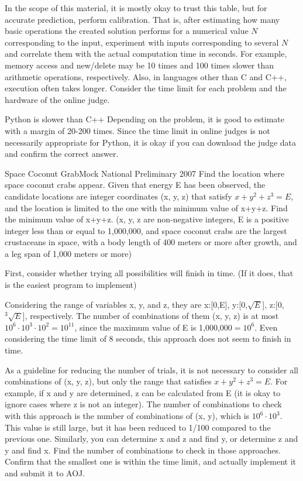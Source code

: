 In the scope of this material, it is mostly okay to trust this table, but for accurate prediction, perform calibration. That is, after estimating how many basic operations the created solution performs for a numerical value $N$ corresponding to the input, experiment with inputs corresponding to several $N$ and correlate them with the actual computation time in seconds. For example, memory access and new/delete may be 10 times and 100 times slower than arithmetic operations, respectively. Also, in languages other than C and C++, execution often takes longer. Consider the time limit for each problem and the hardware of the online judge.

\begin{tipsbox}{Python is slower than C++}
  Depending on the problem, it is good to estimate with a margin of 20-200 times. Since the time limit in online judges is not necessarily appropriate for Python, it is okay if you can download the judge data and confirm the correct answer.
\end{tipsbox}


\begin{pbox}{Space Coconut Grab}{Mock National Preliminary 2007}
Find the location where space coconut crabs appear. Given that energy E has been observed, the candidate locations are integer coordinates (x, y, z) that satisfy $x+y^2+z^3=E$, and the location is limited to the one with the minimum value of x+y+z. Find the minimum value of x+y+z.
(x, y, z are non-negative integers, E is a positive integer less than or equal to 1,000,000, and space coconut crabs are the largest crustaceans in space, with a body length of 400 meters or more after growth, and a leg span of 1,000 meters or more)

\end{pbox}

First, consider whether trying all possibilities will finish in time.
(If it does, that is the easiest program to implement)

Considering the range of variables x, y, and z, they are x:[0,E], y:[0,$\sqrt{E}$],
z:[0,${}^3\sqrt{E}$], respectively. The number of combinations of them (x, y, z) is at most $10^6 \cdot 10^3 \cdot 10^2=10^{11}$, since the maximum value of E is 1,000,000$=10^6$.
Even considering the time limit of 8 seconds, this approach does not seem to finish in time.

As a guideline for reducing the number of trials, it is not necessary to consider all combinations of (x, y, z), but only the range that satisfies $x+y^2+z^3=E$. For example, if x and y are determined, z can be calculated from E (it is okay to ignore cases where z is not an integer). The number of combinations to check with this approach is the number of combinations of (x, y), which is $10^6 \cdot 10^3$.
This value is still large, but it has been reduced to 1/100 compared to the previous one. Similarly, you can determine x and z and find y, or determine z and y and find x. Find the number of combinations to check in those approaches. Confirm that the smallest one is within the time limit, and actually implement it and submit it to AOJ.

